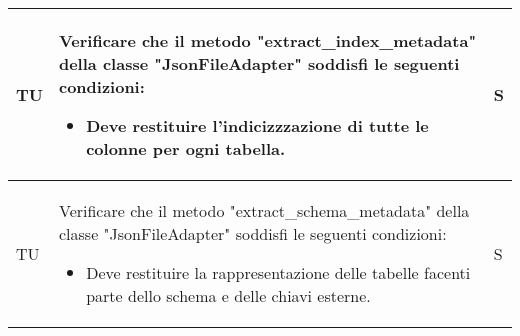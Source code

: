 \begin{adjustwidth}{-0.5cm}{-0.5cm}
\begin{longtable}{|P{1.5cm}|>{\raggedright}P{9.5cm}|>{\arraybackslash}P{1.5cm}|}
		\hline TU & Verificare che il metodo "extract\_index\_metadata" della classe "JsonFileAdapter" soddisfi le seguenti condizioni:
		\begin{itemize}
			\item Deve restituire l'indicizzzazione di tutte le colonne per ogni tabella.
		\end{itemize} & S \\

		\hline TU & Verificare che il metodo "extract\_schema\_metadata" della classe "JsonFileAdapter" soddisfi le seguenti condizioni:
		\begin{itemize}
			\item Deve restituire la rappresentazione delle tabelle facenti parte dello schema e delle chiavi esterne.
		\end{itemize} & S \\


\end{longtable}
\end{adjustwidth}

